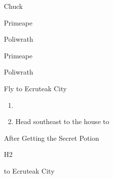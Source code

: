 \begin{paracol}{2}
\begin{boss}{Chuck}
	\varwb
	\begin{notes}
		\item {}
	\end{notes}
	\begin{fightSection}{Primeape}
		\item \xAttack{} \bossHlTwo{2x}
		\item {} \strength
	\end{fightSection}
	\begin{fightSection}{Poliwrath}
		\item {} \headbutt
		\item {} \strength
	\end{fightSection}
	\begin{notes}
		\item \bossHlThree{$\geq$14 DV ATK}
	\end{notes}
	\begin{fightSection}{Primeape}
		\item \xAttack
		\item {} \strength
	\end{fightSection}
	\begin{fightSection}{Poliwrath}
		\item {} \strength{} 
	\end{fightSection}
	\varwe
\end{boss}

\switchcolumn*
\vspace{-2cm}
\begin{story}{Fly to Ecruteak City}
	\varwb
	\varwe
\end{story}

\switchcolumn
\begin{enumerate}[resume]
	\item {}
	\item Head southeast to the house to 
\end{enumerate}

\begin{menu}{After Getting the Secret Potion}
	\varwb
	\begin{packMenu}
		\item \superRepel
		\item \menuHlTwo{(\pointLeft{})} H2 \fly{}
	\end{packMenu}
	\begin{pokeMenu}
		\item {} \fly{} to Ecruteak City \menuHlTwo{(3\pointDown)}
	\end{pokeMenu}
	\varwe
\end{menu}


\end{paracol}
